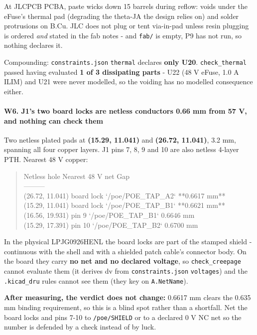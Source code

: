 \documentclass[11pt,a4paper]{article}
\begin{document}
At JLCPCB PCBA, paste wicks down 15 barrels during reflow: voids under the eFuse's thermal pad (degrading the theta-JA the design relies on) and solder protrusions on B.Cu. JLC does not plug or tent via-in-pad unless resin plugging is ordered \emph{and} stated in the fab notes - and \texttt{fab/} is empty, P9 has not run, so nothing declares it.

Compounding: \texttt{constraints.json} \texttt{thermal} declares \textbf{only U20}. \texttt{check\_thermal} passed having evaluated \textbf{1 of 3 dissipating parts} - U22 (48 V eFuse, 1.0 A ILIM) and U21 were never modelled, so the voiding has no modelled consequence either.

\paragraph*{W6. J1's two board locks are netless conductors 0.66 mm from 57 V, and nothing can check them}
Two netless plated pads at \textbf{(15.29, 11.041)} and \textbf{(26.72, 11.041)}, 3.2 mm, spanning all four copper layers. J1 pins 7, 8, 9 and 10 are also netless 4-layer PTH. Nearest 48 V copper:

\begin{quote}\small\ttfamily\raggedright
\textbar{} Netless hole \textbar{} Nearest 48 V net \textbar{} Gap \textbar{}\\
\textbar{}---\textbar{}---\textbar{}---\textbar{}\\
\textbar{} (26.72, 11.041) board lock \textbar{} `/poe/POE\_TAP\_A2` \textbar{} {*}{*}0.6617 mm{*}{*} \textbar{}\\
\textbar{} (15.29, 11.041) board lock \textbar{} `/poe/POE\_TAP\_B1` \textbar{} {*}{*}0.6621 mm{*}{*} \textbar{}\\
\textbar{} (16.56, 19.931) pin 9 \textbar{} `/poe/POE\_TAP\_B1` \textbar{} 0.6646 mm \textbar{}\\
\textbar{} (15.29, 17.391) pin 10 \textbar{} `/poe/POE\_TAP\_B2` \textbar{} 0.6700 mm \textbar{}
\end{quote}
In the physical LPJG0926HENL the board locks are part of the stamped shield - continuous with the shell and with a shielded patch cable's connector body. On the board they carry \textbf{no net and no declared voltage}, so \texttt{check\_creepage} cannot evaluate them (it derives dv from \texttt{constraints.json} \texttt{voltages}) and the \texttt{.kicad\_dru} rules cannot see them (they key on \texttt{A.NetName}).

\textbf{After measuring, the verdict does not change:} 0.6617 mm clears the 0.635 mm binding requirement, so this is a blind spot rather than a shortfall. Net the board locks and pins 7-10 to \texttt{/poe/SHIELD} or to a declared 0 V NC net so the number is defended by a check instead of by luck.
\end{document}
